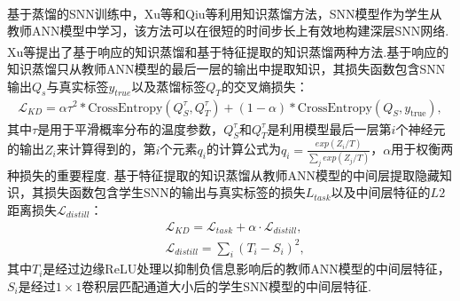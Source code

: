 \documentclass[10.5pt,compsoc,UTF8]{CjC}
\theoremstyle{mystyle}
\newcommand{\upcite}[1]{\textsuperscript{\cite{#1}}}
\begin{document}
\begin{multicols}{1}
基于蒸馏的SNN训练中，Xu等\upcite{xu2023constructing}和Qiu等\upcite{qiu2024self}利用知识蒸馏方法，SNN模型作为学生从教师ANN模型中学习，该方法可以在很短的时间步长上有效地构建深层SNN网络. Xu等\upcite{xu2023constructing}提出了基于响应的知识蒸馏和基于特征提取的知识蒸馏两种方法.基于响应的知识蒸馏只从教师ANN模型的最后一层的输出中提取知识，其损失函数包含SNN输出$Q_s$与真实标签$y_{true}$以及蒸馏标签$Q_T$的交叉熵损失：
\begin{eqnarray}
	\mathcal{L}_{KD} = \alpha \tau^2 * \text{CrossEntropy}(Q_S^{\tau}, Q_T^{\tau})+(1-\alpha) * \text{CrossEntropy}(Q_S, y_{\text{true}}),
\end{eqnarray}
其中$\tau$是用于平滑概率分布的温度参数，$Q_S^{\tau}$和$Q_T^{\tau}$是利用模型最后一层第$i$个神经元的输出$Z_i$来计算得到的，第$i$个元素$q_i$的计算公式为$q_i=\frac{exp(Z_i/T)}{\sum_{j}{exp(Z_j/T)}}$，$\alpha$用于权衡两种损失的重要程度.
基于特征提取的知识蒸馏从教师ANN模型的中间层提取隐藏知识，其损失函数包含学生SNN的输出与真实标签的损失$L_{task}$以及中间层特征的$L2$距离损失$\mathcal{L}_{distill}$：
\begin{align}
	&\mathcal{L}_{KD}=\mathcal{L}_{task}+\alpha \cdot \mathcal{L}_{distill},\\
	&\mathcal{L}_{distill}=\sum_{i}(T_i-S_i)^2,
\end{align}
其中$T_i$是经过边缘ReLU处理以抑制负信息影响后的教师ANN模型的中间层特征，$S_i$是经过$1\times1$卷积层匹配通道大小后的学生SNN模型的中间层特征. %


\end{multicols}
\end{document}
